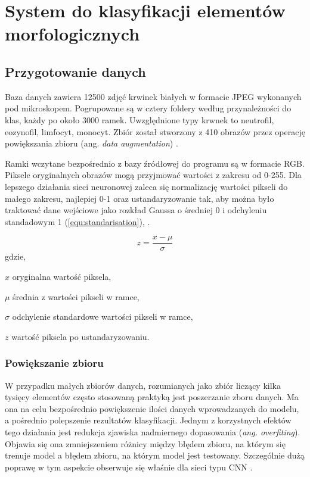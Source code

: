 \chapter{System do klasyfikacji elementów morfologicznych}
\label{cha:system_do_klasyfikacji_elementow_morfologicznych}

\section{Przygotowanie danych}
\label{przygotowanie_danych}

Baza danych zawiera 12500 zdjęć krwinek białych w formacie JPEG wykonanych pod mikroskopem. Pogrupowane są w cztery foldery według przynależności do klas, każdy po około 3000 ramek. Uwzględnione typy krwnek to neutrofil, eozynofil, limfocyt, monocyt. Zbiór został stworzony z 410 obrazów przez operację powiększania zbioru (ang. \textit{data augmentation}) \cite{database_kaggle}.

{\parindent0pt %
Ramki wczytane bezpośrednio z bazy źródłowej do programu są w formacie RGB. Piksele oryginalnych obrazów mogą przyjmować wartości z zakresu od 0-255. Dla lepszego działania sieci neuronowej zaleca się normalizację wartości pikseli do małego zakresu, najlepiej 0-1 oraz ustandaryzowanie tak, aby można było traktować dane wejściowe jako rozkład Gaussa o średniej 0 i odchyleniu standadowym 1 (\ref{equ:standarisation}), \cite{standarisation}.

\begin{equation}
z =  \frac{x - \mu}{\sigma} 
\label{equ:standarisation}
\end{equation}
gdzie,
\begin{eqwhere}[2cm]
	\item[$x$] oryginalna wartość piksela,
	\item[$\mu$] średnia z wartości pikseli w ramce,
	\item[$\sigma$] odchylenie standardowe wartości pikseli w ramce,
	\item[$z$] wartość piksela po ustandaryzowaniu.
\end{eqwhere}
}

\subsection{Powiększanie zbioru}
W przypadku małych zbiorów danych, rozumianych jako zbiór liczący kilka tysięcy elementów często stosowaną praktyką jest poszerzanie zboru danych. Ma ona na celu bezpośrednio powiększenie ilości danych wprowadzanych do modelu, a pośrednio polepszenie rezultatów klasyfikacji. Jednym z korzystnych efektów tego działania jest redukcja zjawiska nadmiernego dopasowania (\textit{ang. overfiting}). Objawia się ona zmniejszeniem różnicy między błędem zbioru, na którym się trenuje model a błędem zbioru, na którym model jest testowany. Szczególnie dużą poprawę w tym aspekcie obserwuje się właśnie dla sieci typu CNN \cite{Wong2016UnderstandingDA}.

